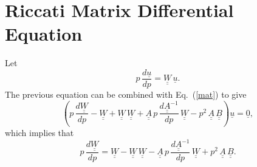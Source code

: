 \documentclass[12pt,prb,aps,notitlepage]{revtex4-1}
\begin{document}
\section{Riccati Matrix Differential Equation}
Let
\begin{equation}\label{wdef}
 p\,\frac{d\underline{u}}{dp}=\underline{\underline{W}}\,\underline{u}.
\end{equation}
The previous equation can be combined with Eq.~(\ref{mat}) to give 
\begin{equation}
\left(p\,\frac{d\underline{\underline{W}}}{dp} - \underline{\underline{W}} 
+ \underline{\underline{W}}\,\underline{\underline{W}} + \underline{\underline{A}}\,p\,\frac{d\underline{\underline{A}}^{-1}}{dp}\,\underline{\underline{W}}- p^2\,\underline{\underline{A}}\,\underline{\underline{B}}\right)\underline{u} = \underline{0},
\end{equation}
which implies that 
\begin{equation}
p\,\frac{d\underline{\underline{W}}}{dp} = \underline{\underline{W}} - \underline{\underline{W}}\,\underline{\underline{W}} - \underline{\underline{A}}\,p\,\frac{d\underline{\underline{A}}^{-1}}{dp}\,\underline{\underline{W}}
+ p^2\,\underline{\underline{A}}\,\underline{\underline{B}}.
\end{equation}
\end{document}
